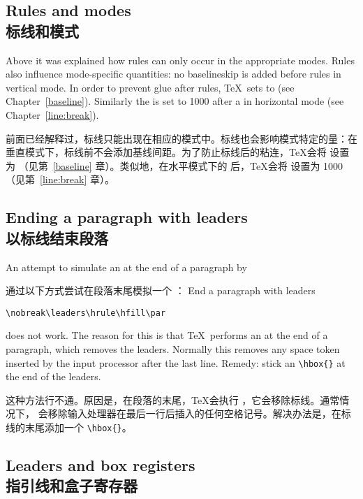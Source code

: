 \subsection{Rules and modes\\标线和模式}

Above it was explained how rules can only occur in the 
appropriate modes. Rules also influence mode-specific
quantities:
no baselineskip is added before rules in 
vertical mode. In order to prevent glue after rules,
\TeX\ sets  to
\n{\hbox{-}1000pt}
(see Chapter~\ref{baseline}).
Similarly the  is set to 1000 after a 
in horizontal mode (see Chapter~\ref{line:break}).

前面已经解释过，标线只能出现在相应的模式中。标线也会影响模式特定的量：在垂直模式下，标线前不会添加基线间距。为了防止标线后的粘连，\TeX 会将  设置为 \n{\hbox{-}1000pt}（见第~\ref{baseline} 章）。类似地，在水平模式下的  后，\TeX 会将  设置为 1000（见第~\ref{line:break} 章）。

\subsection{Ending a paragraph with leaders\\以标线结束段落}
\label{par:leaders:end}

An attempt to simulate an  at the end of a paragraph by

通过以下方式尝试在段落末尾模拟一个 ：
\howto End a paragraph with leaders\par

\begin{verbatim}
\nobreak\leaders\hrule\hfill\par
\end{verbatim}
does not work. The reason for this is that \TeX\
performs an  at the end of a paragraph,
which removes the leaders. Normally this  removes
any space token inserted by the input processor after the
last line. Remedy: stick an \verb.\hbox{}. at the end of
the leaders.

这种方法行不通。原因是，在段落的末尾，\TeX 会执行 ，它会移除标线。通常情况下， 会移除输入处理器在最后一行后插入的任何空格记号。解决办法是，在标线的末尾添加一个 \verb.\hbox{}.。
\subsection{Leaders and box registers\\指引线和盒子寄存器}

